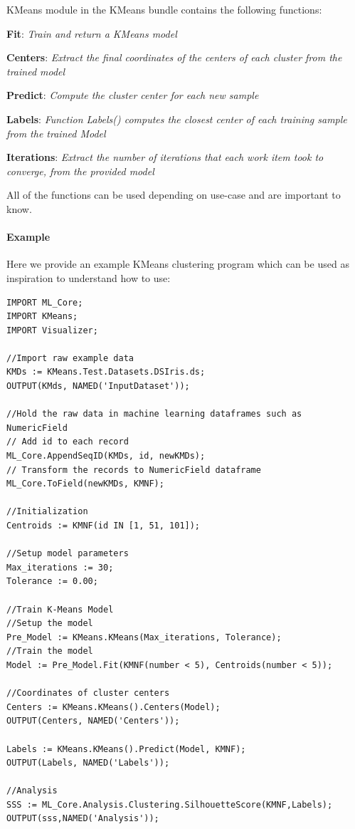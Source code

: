 \documentclass[a4paper,oneside,12pt]{book}
\begin{document}
KMeans module in the KMeans bundle contains the following functions:

\textbf{Fit}: \textit{Train and return a KMeans model}

\textbf{Centers}: \textit{Extract the final coordinates of the centers of each cluster from the trained model}

\textbf{Predict}: \textit{Compute the cluster center for each new sample}

\textbf{Labels}: \textit{Function Labels() computes the closest center of each training sample from the trained Model}

\textbf{Iterations}: \textit{Extract the number of iterations that each work item took to converge, from the provided model}

All of the functions can be used depending on use-case and are important to know.

\paragraph{Example}

Here we provide an example KMeans clustering program which can be used as inspiration to understand how to use:

\begin{lstlisting}
IMPORT ML_Core;
IMPORT KMeans;
IMPORT Visualizer;

//Import raw example data
KMDs := KMeans.Test.Datasets.DSIris.ds;
OUTPUT(KMds, NAMED('InputDataset'));

//Hold the raw data in machine learning dataframes such as NumericField
// Add id to each record
ML_Core.AppendSeqID(KMDs, id, newKMDs);
// Transform the records to NumericField dataframe
ML_Core.ToField(newKMDs, KMNF);

//Initialization
Centroids := KMNF(id IN [1, 51, 101]);

//Setup model parameters
Max_iterations := 30;
Tolerance := 0.00;

//Train K-Means Model
//Setup the model
Pre_Model := KMeans.KMeans(Max_iterations, Tolerance);
//Train the model
Model := Pre_Model.Fit(KMNF(number < 5), Centroids(number < 5));

//Coordinates of cluster centers
Centers := KMeans.KMeans().Centers(Model);
OUTPUT(Centers, NAMED('Centers'));

Labels := KMeans.KMeans().Predict(Model, KMNF);
OUTPUT(Labels, NAMED('Labels'));

//Analysis
SSS := ML_Core.Analysis.Clustering.SilhouetteScore(KMNF,Labels);
OUTPUT(sss,NAMED('Analysis'));
\end{lstlisting}
\end{document}
